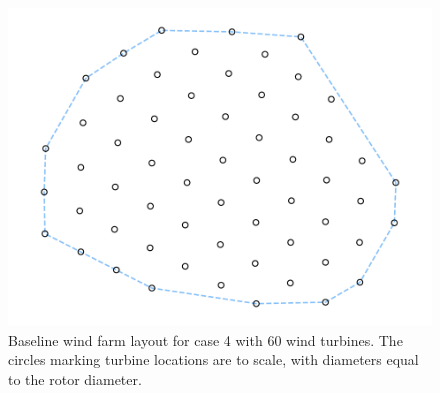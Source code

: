 \documentclass[hidelinks,sort&compress,AMA,STIX1COL]{WileyNJD-v2}
\providecommand{\DIFaddend}{} %
\providecommand{\DIFaddbeginFL}{} %
\providecommand{\DIFaddendFL}{} %
\providecommand{\DIFdelbeginFL}{} %
\providecommand{\DIFdelendFL}{} %
\newcommand{\DIFscaledelfig}{0.5}
\newlength{\DIFdelgraphicswidth} %
\newlength{\DIFdelgraphicsheight} %
\newcommand{\DIFaddincludegraphics}[2][]{{\color{blue}\fbox{\DIFOincludegraphics[#1]{#2}}}} %
\newcommand{\DIFdelincludegraphics}[2][]{%
\sbox{\DIFdelgraphicsbox}{\DIFOincludegraphics[#1]{#2}}%
\settoboxwidth{\DIFdelgraphicswidth}{\DIFdelgraphicsbox} %
\settoboxtotalheight{\DIFdelgraphicsheight}{\DIFdelgraphicsbox} %
\scalebox{\DIFscaledelfig}{%
\parbox[b]{\DIFdelgraphicswidth}{\usebox{\DIFdelgraphicsbox}\\[-\baselineskip] \rule{\DIFdelgraphicswidth}{0em}}\llap{\resizebox{\DIFdelgraphicswidth}{\DIFdelgraphicsheight}{%
\setlength{\unitlength}{\DIFdelgraphicswidth}%
\begin{picture}(1,1)%
\thicklines\linethickness{2pt} %
{\color[rgb]{1,0,0}\put(0,0){\framebox(1,1){}}}%
{\color[rgb]{1,0,0}\put(0,0){\line( 1,1){1}}}%
{\color[rgb]{1,0,0}\put(0,1){\line(1,-1){1}}}%
\end{picture}%
}\hspace*{3pt}}} %
} %
\DeclareRobustCommand{\DIFaddend}{\DIFOaddend \let\includegraphics\DIFOincludegraphics} %
\DeclareRobustCommand{\DIFaddbeginFL}{\DIFOaddbeginFL \let\includegraphics\DIFaddincludegraphics} %
\DeclareRobustCommand{\DIFaddendFL}{\DIFOaddendFL \let\includegraphics\DIFOincludegraphics} %
\DeclareRobustCommand{\DIFdelbeginFL}{\DIFOdelbeginFL \let\includegraphics\DIFdelincludegraphics} %
\DeclareRobustCommand{\DIFdelendFL}{\DIFOaddendFL \let\includegraphics\DIFOincludegraphics} %
\begin{document}
\DIFaddend \begin{figure}[h!]
	\centering
	\begin{minipage}[t]{18pc}
		\centering
		\DIFdelbeginFL %
\DIFdelendFL \DIFaddbeginFL \includegraphics[width=1.\textwidth, trim={1.0cm, 0cm, 1.0cm, 0cm}, clip]{final_images/layouts/Figure_14.pdf}
		\DIFaddendFL \caption{Baseline wind farm layout for case 4 with 60 wind turbines. The circles marking turbine locations are to scale, with diameters equal to the rotor diameter.}
		\label{fig:layout4}
	\end{minipage}\hspace{1pc}%
\end{figure}
\end{document}
